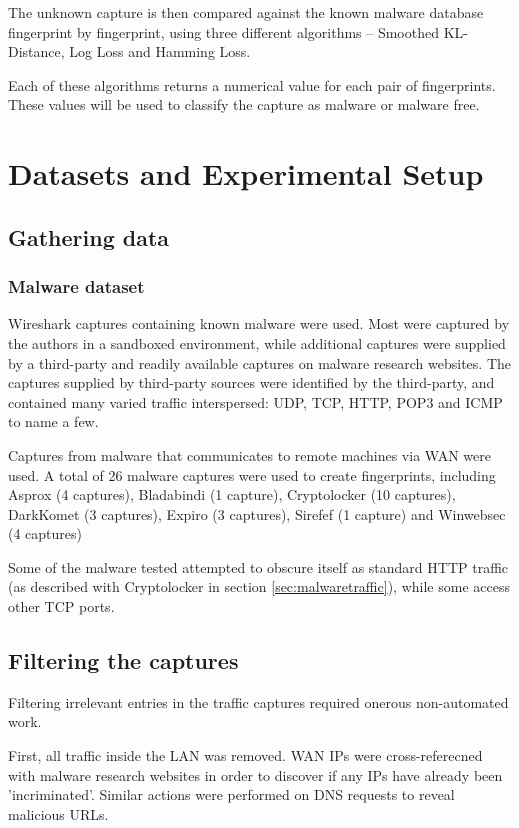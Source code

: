 \documentclass[13pt,journal,compsoc,onecolumn]{IEEEtran}
\begin{document}
The unknown capture is then compared against the known malware database fingerprint by fingerprint, using three different algorithms – Smoothed KL-Distance, Log Loss and Hamming Loss.

Each of these algorithms returns a numerical value for each pair of fingerprints. These values will be used to classify the capture as malware or malware free.
\section{Datasets and Experimental Setup}
\subsection{Gathering data}
\subsubsection{Malware dataset}

Wireshark captures containing known malware were used. Most were captured by the authors in a sandboxed environment, while additional captures were supplied by a third-party and readily available captures on malware research websites.
The captures supplied by third-party sources were identified by the third-party, and contained many varied traffic interspersed: UDP, TCP, HTTP, POP3 and ICMP to name a few.

Captures from malware that communicates to remote machines via WAN were used.
A total of 26 malware captures were used to create fingerprints, including Asprox (4 captures), Bladabindi (1 capture), Cryptolocker (10 captures), DarkKomet (3 captures), Expiro (3 captures), Sirefef (1 capture) and Winwebsec (4 captures)

Some of the malware tested attempted to obscure itself as standard HTTP traffic (as described with Cryptolocker in section \ref{sec:malwaretraffic}), while some access other TCP ports.

\subsection{Filtering the captures}
Filtering irrelevant entries in the traffic captures required onerous non-automated work.

First, all traffic inside the LAN was removed. WAN IPs were cross-referecned with malware research websites in order to discover if any IPs have already been 'incriminated'.
Similar actions were performed on DNS requests to reveal malicious URLs.
\end{document}

